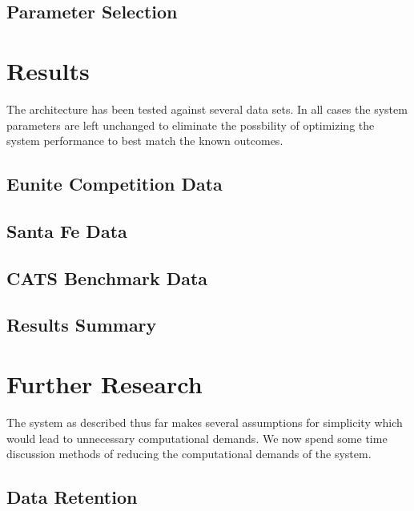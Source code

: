\documentclass[10pt]{article}
\begin{document}


\subsection{Parameter Selection}


\section{Results}
The architecture has been tested against several data sets.  In all cases the system parameters are left unchanged to eliminate the possbility of optimizing the system performance to best match the known outcomes.

\subsection{Eunite Competition Data}


\subsection{Santa Fe Data}


\subsection{CATS Benchmark Data}


\subsection{Results Summary}


\section{Further Research}
The system as described thus far makes several assumptions for simplicity which would lead to unnecessary computational demands.  We now spend some time discussion methods of reducing the computational demands of the system.  

\subsection{Data Retention}
\end{document}
